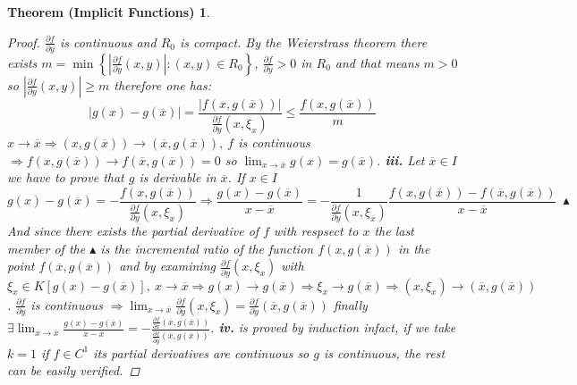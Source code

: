\documentclass{article}
\newtheorem*{implicitfunctions}{Theorem (Implicit Functions)}
\begin{document}
\begin{implicitfunctions}
\begin{proof}
                    $\frac{\partial f}{\partial y}$ is continuous and $R_0$ is compact. By the Weierstrass theorem there exists $m = \min\left\{ \left\lvert \frac{\partial f}{\partial y} (x,y) \right\rvert : (x,y) \in R_0 \right\}$, $\frac{\partial f}{\partial y} > 0$ in $R_0$ and that means $m > 0$ so $\left\lvert \frac{\partial f}{\partial y} (x,y) \right\rvert \geq m$ therefore one has:
                    \begin{equation*}
                        \left\lvert g(x) - g(\overline{x}) \right\rvert = \frac{\left\lvert f(x,g(\overline{x}))\right\rvert }{\frac{\partial f}{\partial y}(x,\xi_x)} \leq \frac{f(x,g(\overline{x}))}{m}    
                    \end{equation*}
                    $x \to \overline{x} \Rightarrow (x,g(\overline{x})) \to (\overline{x},g(\overline{x})), \ f$ is continuous $\Rightarrow f(x,g(\overline{x})) \to f(\overline{x},g(\overline{x})) = 0 $ so $\lim_{x \to \overline{x}}g(x) = g(\overline{x})$. \textbf{iii.} Let $\overline{x} \in I$ we have to prove that $g$ is derivable in $\overline{x}$. If $x \in I$ 
                    \begin{equation*} 
                        g(x) - g(\overline{x}) = - \frac{f(x,g(\overline{x}))}{\frac{\partial f}{\partial y}(x,\xi_x)} \Rightarrow \frac{g(x) - g(\overline{x})}{x - \overline{x}} = -\frac{1}{\frac{\partial f}{\partial y}(x,\xi_x)}\frac{f(x,g(\overline{x})) - f(\overline{x},g(\overline{x}))}{x - \overline{x}} \ \blacktriangle    
                    \end{equation*}
                    And since there exists the partial derivative of $f$ with respsect to $x$ the last member of the $\blacktriangle$ is the incremental ratio of the function $f(x,g(\overline{x}))$ in the point $f(\overline{x},g(\overline{x}))$ and by examining $\frac{\partial f}{\partial y}(x,\xi_x)$ with $\xi_x \in K[g(x) - g(\overline{x})], \ x \to \overline{x} \Rightarrow g(x) \to g(\overline{x}) \Rightarrow \xi_x \to g(\overline{x}) \Rightarrow (x,\xi_x) \to (\overline{x}, g(\overline{x}))$. $\frac{\partial f}{\partial y}$ is continuous $\Rightarrow \lim_{x \to \overline{x}} \frac{\partial f}{\partial y}(x, \xi_x) = \frac{\partial f}{\partial y}(\overline{x},g(\overline{x}))$ finally $\exists \lim_{x \to \overline{x}}\frac{g(x) - g(\overline{x})}{x - \overline{x}} = -\frac{\frac{\partial f}{\partial x}(\overline{x},g(\overline{x}))}{\frac{\partial f}{\partial y}(\overline{x},g(\overline{x}))}$. \textbf{iv.} is proved by induction infact, if we take $k = 1$ if $f \in C^1$ its partial derivatives are continuous so $g$ is continuous, the rest can be easily verified.
                \end{proof}

            \end{implicitfunctions}
\end{document}
